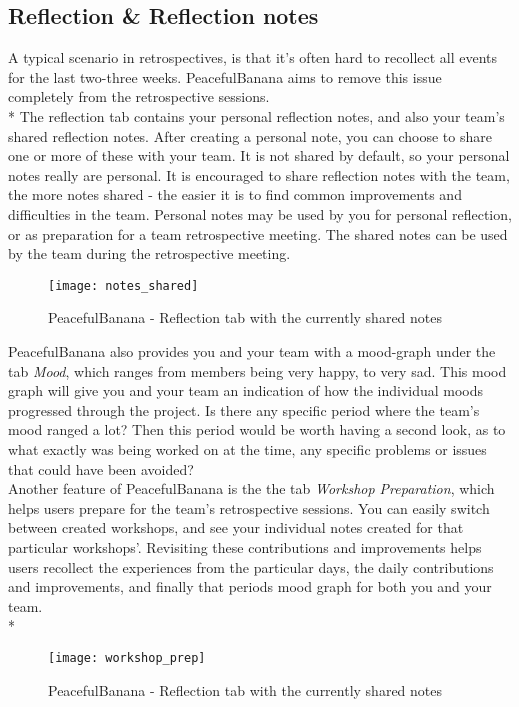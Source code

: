\subsection{Reflection \& Reflection notes}
A typical scenario in retrospectives, is that it's often hard to recollect all events for the last two-three weeks. PeacefulBanana aims to remove this issue completely from the retrospective sessions.\\*
The reflection tab contains your personal reflection notes, and also your team's shared reflection notes. After creating a personal note, you can choose to share one or more of these with your team. It is not shared by default, so your personal notes really are personal. It is encouraged to share reflection notes with the team, the more notes shared - the easier it is to find common improvements and difficulties in the team. Personal notes may be used by you for personal reflection, or as preparation for a team retrospective meeting. The shared notes can be used by the team during the retrospective meeting.\\
\begin{figure}[h!]
\centering
	\texttt{[image: notes\_shared]}
\caption{PeacefulBanana - Reflection tab with the currently shared notes}
\label{notesshared}
\end{figure}
PeacefulBanana also provides you and your team with a mood-graph under the tab \textit{Mood}, which ranges from members being very happy, to very sad. This mood graph will give you and your team an indication of how the individual moods progressed through the project. Is there any specific period where the team's mood ranged a lot? Then this period would be worth having a second look, as to what exactly was being worked on at the time, any specific problems or issues that could have been avoided?\\

Another feature of PeacefulBanana is the the tab \textit{Workshop Preparation}, which helps users prepare for the team's retrospective sessions. You can easily switch between created workshops, and see your individual notes created for that particular workshops'. Revisiting these contributions and improvements helps users recollect the experiences from the particular days, the daily contributions and improvements, and finally that periods mood graph for both you and your team.\\*
\begin{figure}[h!]
\centering
	\texttt{[image: workshop\_prep]}
\caption{PeacefulBanana - Reflection tab with the currently shared notes}
\label{workshopprep}
\end{figure}


